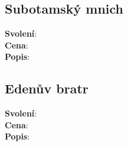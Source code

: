 \documentclass[../main.tex]{subfiles}
\begin{document}
\begin{itemize}
\begin{tcolorbox}
\subsection{Subotamský mnich}
\label{sec:pov-subotam}
\textbf{Svolení}:\\
\textbf{Cena}:\\
\textbf{Popis}:\\
\end{tcolorbox}

\begin{tcolorbox}
\subsection{Edenův bratr}
\label{sec:pov-edenak}
\textbf{Svolení}:\\
\textbf{Cena}:\\
\textbf{Popis}:\\
\end{tcolorbox}

\end{itemize}
\end{document}
